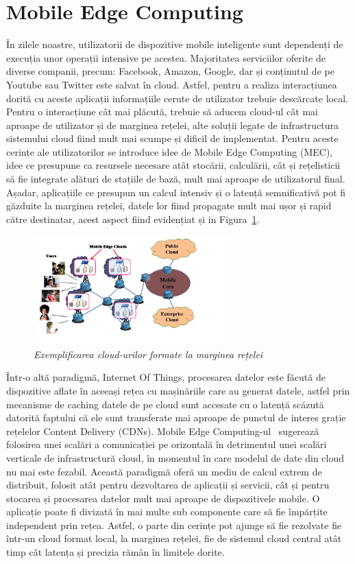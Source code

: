 \documentclass[12pt,a4paper]{report}
\begin{document}
\section{Mobile Edge Computing} \label{mobileEdgeComputing}
În zilele noastre, utilizatorii de dispozitive mobile inteligente sunt dependenți de execuția unor operații intensive pe acestea. Majoritatea serviciilor oferite de diverse companii, precum: Facebook, Amazon, Google, dar și conținutul de pe Youtube sau Twitter este salvat în cloud. Astfel, pentru a realiza interacțiunea dorită cu aceste aplicații informațiile cerute de utilizator trebuie descărcate local. Pentru o interacțiune cât mai plăcută, trebuie să aducem cloud-ul cât mai aproape de utilizator și de marginea rețelei, alte soluții legate de infrastructura sistemului cloud fiind mult mai scumpe și dificil de implementat. Pentru aceste cerințe ale utilizatorilor se introduce idee de Mobile Edge Computing (MEC), idee ce presupune ca resursele necesare atât stocării, calculării, cât și rețelisticii să fie integrate alături de stațiile de bază, mult mai aproape de utilizatorul final. Așadar, aplicațiile ce presupun un calcul intensiv și o latență semnificativă pot fi găzduite la marginea rețelei, datele lor fiind propagate mult mai ușor și rapid către destinatar, acest aspect fiind evidențiat și in Figura~\ref{fig:pic0}.
\begin{figure}[th]
\centering
\includegraphics[width=3in]{pics/mobile-edge-computing.jpg}
  \caption{\emph{Exemplificarea cloud-urilor formate la marginea rețelei}\protect\footnotemark}
  \label{fig:pic0}
\end{figure}
Într-o altă paradigmă, Internet Of Things, procesarea datelor este făcută de dispozitive aflate în aceeași rețea cu mașinăriile care au generat datele, astfel prin mecanisme de caching datele de pe cloud sunt accesate cu o latență scăzută datorită faptului că ele sunt transferate mai aproape de punctul de interes grație rețelelor Content Delivery (CDNs). Mobile Edge Computing-ul~\cite{MecSurvey} sugerează folosirea unei scalări a comunicației pe orizontală în detrimentul unei scalări verticale de infrastructură cloud, în momentul în care modelul de date din cloud nu mai este fezabil. Această paradigmă oferă un mediu de calcul extrem de distribuit, folosit atât pentru dezvoltarea de aplicații și servicii, cât și pentru stocarea și procesarea datelor mult mai aproape de dispozitivele mobile. O aplicație poate fi divizată în mai multe sub componente care să fie împărțite independent prin rețea. Astfel, o parte din cerințe pot ajunge să fie rezolvate fie într-un cloud format local, la marginea rețelei, fie de sistemul cloud central atât timp cât latența și precizia rămân în limitele dorite.
\end{document}
